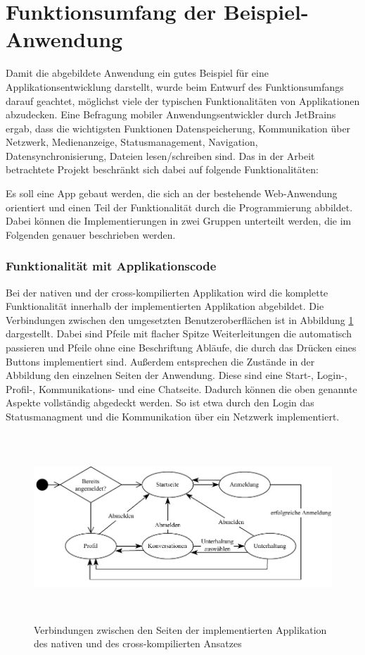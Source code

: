 \section{Funktionsumfang der Beispiel-Anwendung}
Damit die abgebildete Anwendung ein gutes Beispiel für eine Applikationsentwicklung darstellt, wurde beim Entwurf des Funktionsumfangs darauf geachtet, möglichst viele der typischen Funktionalitäten von Applikationen abzudecken. Eine Befragung \cite{JetBrains_miscellaneous_2021} mobiler Anwendungsentwickler durch JetBrains ergab, dass die wichtigsten Funktionen Datenspeicherung, Kommunikation über Netzwerk, Medienanzeige, Statusmanagement, Navigation, Datensynchronisierung, Dateien lesen/schreiben sind.
Das in der Arbeit betrachtete Projekt beschränkt sich dabei auf folgende Funktionalitäten:

Es soll eine App gebaut werden, die sich an der bestehende Web-Anwendung orientiert und einen Teil der Funktionalität durch die Programmierung abbildet. Dabei können die Implementierungen in zwei Gruppen unterteilt werden, die im Folgenden genauer beschrieben werden.

\subsubsection{Funktionalität mit Applikationscode}
Bei der nativen und der cross-kompilierten Applikation wird die komplette Funktionalität innerhalb der implementierten Applikation abgebildet. Die Verbindungen zwischen den umgesetzten Benutzeroberflächen ist in Abbildung \ref{fig:pageflow} dargestellt. Dabei sind Pfeile mit flacher Spitze Weiterleitungen die automatisch passieren und Pfeile ohne eine Beschriftung Abläufe, die durch das Drücken eines Buttons implementiert sind. Außerdem entsprechen die Zustände in der Abbildung den einzelnen Seiten der Anwendung. Diese sind eine Start-, Login-, Profil-, Kommunikations- und eine Chatseite. Dadurch können die oben genannte Aspekte vollständig abgedeckt werden. So ist etwa durch den Login das Statusmanagment und die Kommunikation über ein Netzwerk implementiert. 

\begin{figure}[ht]
  \centering
  \includegraphics[height=7cm,keepaspectratio]{images/Pageflow_native_flutter.drawio.pdf} 
  \caption[Seitenablauf der implemierten nativen und cross-kompilierten Applikation]{Verbindungen zwischen den Seiten der implementierten Applikation des nativen und des cross-kompilierten Ansatzes}
  \label{fig:pageflow}
\end{figure}

